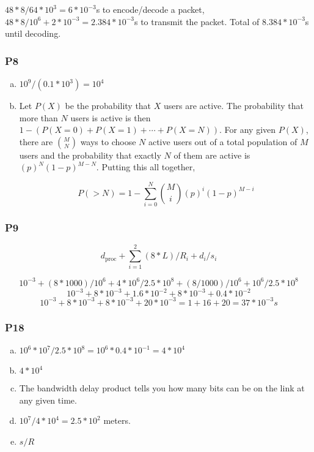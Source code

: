 \documentclass[11pt]{article}
\begin{document}
$48 * 8 / 64*10^3 = 6*10^{-3}$s to encode/decode a packet, $48*8/10^6 + 2*10^{-3} = 2.384*10^{-3}$s to transmit the packet. Total of $8.384*10^{-3}$s until decoding. 

\subsubsection{P8}

\begin{enumerate}[(a)]
    \item $10^9/(0.1 * 10^3) = 10^4$
    \item Let $P(X)$ be the probability that $X$ users are active. The probability that more than $N$ users is active is then $1 - (P(X=0) + P(X=1) + \cdots + P(X=N))$. For any given $P(X)$, there are $M \choose N$ ways to choose $N$ active users out of a total population of $M$ users and the probability that exactly $N$ of them are active is $(p)^N (1-p)^{M-N}$. Putting this all together,
    
    \[ P(>N) = 1 - \sum_{i=0}^{N} {M \choose i} (p)^i (1-p)^{M-i} \]
\end{enumerate} 

\subsubsection{P9}

\[ d_{\text{proc}} + \sum_{i=1}^{2} (8*L) / R_i + d_i / s_i \]

\[ 10^{-3} + (8*1000) / 10^6 + 4*10^6 / 2.5*10^8 + (8/1000) / 10^6 + 10^6 / 2.5*10^8 \]
\[ 10^{-3} + 8*10^{-3} + 1.6*10^{-2} + 8*10^{-3} + 0.4*10^{-2} \]
\[ 10^{-3} + 8*10^{-3} + 8*10^{-3} + 20*10^{-3} = 1 + 16 + 20 = 37*10^{-3}s \]

\subsubsection{P18}

\begin{enumerate}[(a)]
    \item $10^6 * 10^7/2.5*10^8 = 10^6 * 0.4 * 10^{-1} = 4 * 10^4$
    \item $4*10^4$
    \item The bandwidth delay product tells you how many bits can be on the link at any given time.
    \item $10^7 / 4*10^4 = 2.5 * 10^2$ meters.
    \item $s/R$
\end{enumerate}
\end{document}
